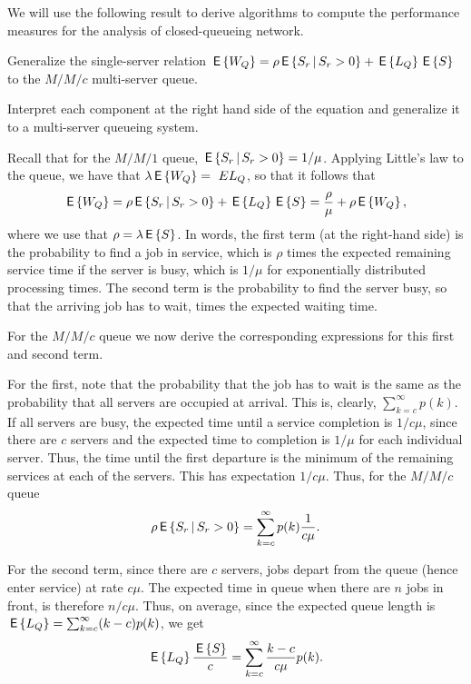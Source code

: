 We will use the following result to derive algorithms to compute the
performance measures for the analysis of closed-queueing network.
\begin{exercise}
  Generalize the single-server relation
  $\,\mathsf{E}\left\{W_Q\right\} = \rho \,\mathsf{E}\left\{S_r\,\middle|\, S_r>0\right\} + \,\mathsf{E}\left\{L_Q\right\} \,\mathsf{E}\left\{S\right\}$ to the $M/M/c$
  multi-server queue. 
\begin{hint}
Interpret each component at the right hand side of the equation
    and generalize it to a multi-server queueing system. 
\end{hint}
  \begin{solution}
    Recall that for the $M/M/1$ queue, $\,\mathsf{E}\left\{S_r\,\middle|\, S_r>0\right\} = 1/\mu$.
    Applying Little's law to the queue, we have that
    $\lambda \,\mathsf{E}\left\{W_Q\right\} =\ E{L_Q}$, so that it follows that
    \begin{equation*}
    \,\mathsf{E}\left\{W_Q\right\} = \rho \,\mathsf{E}\left\{S_r \,\middle|\, S_r > 0\right\} + \,\mathsf{E}\left\{L_Q\right\}\,\mathsf{E}\left\{S\right\} = \frac{\rho}\mu + \rho \,\mathsf{E}\left\{W_Q\right\},
    \end{equation*}
    where we use that $\rho=\lambda \,\mathsf{E}\left\{S\right\}$. In words, the first term
    (at the right-hand side) is the probability to find a job in
    service, which is $\rho$ times the expected remaining service
    time if the server is busy, which is $1/\mu$ for exponentially
    distributed processing times. The second term is the probability
    to find the server busy, so that the arriving job has to wait,
    times the expected waiting time. 

    For the $M/M/c$ queue we now derive the corresponding expressions
    for this first and second term.

    For the first, note that the probability that the job has to wait
    is the same as the probability that all servers are occupied at
    arrival. This is, clearly, $\sum_{k=c}^\infty p(k)$. If all
    servers are busy, the expected time until a service completion is
    $1/c\mu$, since there are $c$ servers and the expected time to
    completion is $1/\mu$ for each individual server. Thus, the time
    until the first departure is the minimum of the remaining services
    at each of the servers. This has expectation $1/c\mu$. Thus, for the
    $M/M/c$ queue
    \begin{equation*}
\rho\,\mathsf{E}\left\{S_r\,\middle|\, S_r>0\right\}  = \sum_{k=c}^\infty p(k) \frac 1{c\mu}.
    \end{equation*}

    For the second term, since there are $c$ servers, jobs depart from
    the queue (hence enter service) at rate $c\mu$. The expected time
    in queue when there are $n$ jobs in front, is therefore
    $n/c\mu$. Thus, on average, since the expected queue length is $\,\mathsf{E}\left\{L_Q\right\}=\sum_{k=c}^\infty (k-c)p(k)$, we 
get 
\begin{equation*}
  \,\mathsf{E}\left\{L_Q\right\}\frac{\,\mathsf{E}\left\{S\right\}}c = \sum_{k=c}^\infty \frac{k-c}{c\mu}p(k).
\end{equation*}


\end{solution}
\end{exercise}
